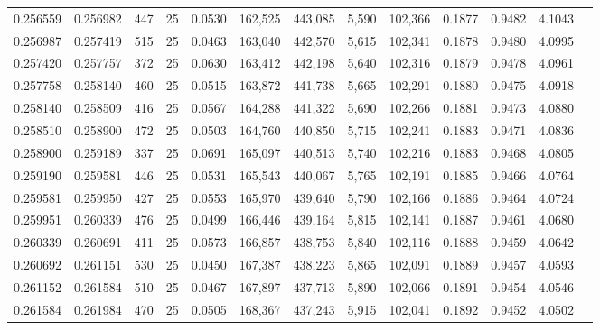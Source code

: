 \begin{tabular}{rrrrrrrrrrrrr}
0.256559 & 0.256982 &   447 &  25 &                                     0.0530 & 162,525 & 443,085 &   5,590 & 102,366 & 0.1877 & 0.9482 & 4.1043 \\
0.256987 & 0.257419 &   515 &  25 &                                     0.0463 & 163,040 & 442,570 &   5,615 & 102,341 & 0.1878 & 0.9480 & 4.0995 \\
0.257420 & 0.257757 &   372 &  25 &                                     0.0630 & 163,412 & 442,198 &   5,640 & 102,316 & 0.1879 & 0.9478 & 4.0961 \\
0.257758 & 0.258140 &   460 &  25 &                                     0.0515 & 163,872 & 441,738 &   5,665 & 102,291 & 0.1880 & 0.9475 & 4.0918 \\
0.258140 & 0.258509 &   416 &  25 &                                     0.0567 & 164,288 & 441,322 &   5,690 & 102,266 & 0.1881 & 0.9473 & 4.0880 \\
0.258510 & 0.258900 &   472 &  25 &                                     0.0503 & 164,760 & 440,850 &   5,715 & 102,241 & 0.1883 & 0.9471 & 4.0836 \\
0.258900 & 0.259189 &   337 &  25 &                                     0.0691 & 165,097 & 440,513 &   5,740 & 102,216 & 0.1883 & 0.9468 & 4.0805 \\
0.259190 & 0.259581 &   446 &  25 &                                     0.0531 & 165,543 & 440,067 &   5,765 & 102,191 & 0.1885 & 0.9466 & 4.0764 \\
0.259581 & 0.259950 &   427 &  25 &                                     0.0553 & 165,970 & 439,640 &   5,790 & 102,166 & 0.1886 & 0.9464 & 4.0724 \\
0.259951 & 0.260339 &   476 &  25 &                                     0.0499 & 166,446 & 439,164 &   5,815 & 102,141 & 0.1887 & 0.9461 & 4.0680 \\
0.260339 & 0.260691 &   411 &  25 &                                     0.0573 & 166,857 & 438,753 &   5,840 & 102,116 & 0.1888 & 0.9459 & 4.0642 \\
0.260692 & 0.261151 &   530 &  25 &                                     0.0450 & 167,387 & 438,223 &   5,865 & 102,091 & 0.1889 & 0.9457 & 4.0593 \\
0.261152 & 0.261584 &   510 &  25 &                                     0.0467 & 167,897 & 437,713 &   5,890 & 102,066 & 0.1891 & 0.9454 & 4.0546 \\
0.261584 & 0.261984 &   470 &  25 &                                     0.0505 & 168,367 & 437,243 &   5,915 & 102,041 & 0.1892 & 0.9452 & 4.0502 \\

\end{tabular}
